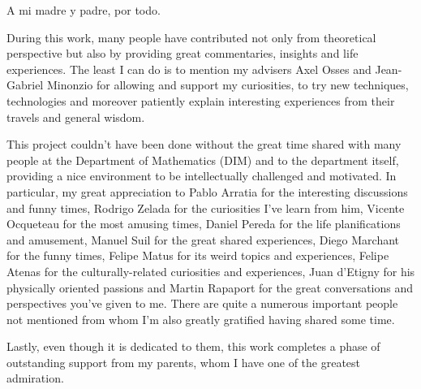 \documentclass[upright, contnum]{umemoria}
\begin{document}
\begin{dedicated}
A mi madre y padre, por todo.
\end{dedicated}

\begin{thanks}
During this work, many people have contributed not only from theoretical perspective but also by providing great commentaries, insights and life experiences. The least I can do is to mention my advisers Axel Osses and Jean-Gabriel Minonzio for allowing and support my curiosities, to try new techniques, technologies and moreover patiently explain interesting experiences from their travels and general wisdom.

This project couldn't have been done without the great time shared with many people at the Department of Mathematics (DIM) and to the department itself, providing a nice environment to be intellectually challenged and motivated.
In particular, my great appreciation to Pablo Arratia for the interesting discussions and funny times, Rodrigo Zelada for the curiosities I've learn from him, Vicente Ocqueteau for the most amusing times, Daniel Pereda for the life planifications and amusement, Manuel Suil for the great shared experiences, Diego Marchant for the funny times, Felipe Matus for its weird topics and experiences, Felipe Atenas for the culturally-related curiosities and experiences, Juan d'Etigny for his physically oriented passions and Martin Rapaport for the great conversations and perspectives you've given to me. 
There are quite a numerous important people not mentioned from whom I'm also greatly gratified having shared some time.


Lastly, even though it is dedicated to them, this work completes a phase of outstanding support from my parents, whom I have one of the greatest admiration.

\end{thanks}


\cleardoublepage

\tableofcontents
\listoftables %
\listoffigures %

\mainmatter









 

\end{document}
